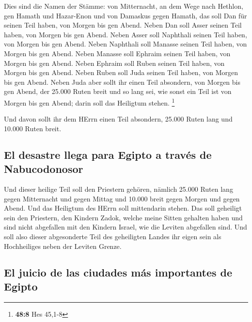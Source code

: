 Dies sind die Namen der Stämme: von Mitternacht, an dem
Wege nach Hethlon, gen Hamath und Hazar-Enon und von Damaskus gegen
Hamath, das soll Dan für seinen Teil haben, von Morgen bis gen Abend.
 Neben Dan soll Asser seinen Teil haben, von Morgen bis
gen Abend.  Neben Asser soll Naphthali seinen Teil haben,
von Morgen bis gen Abend.  Neben Naphthali soll Manasse
seinen Teil haben, von Morgen bis gen Abend.  Neben
Manasse soll Ephraim seinen Teil haben, von Morgen bis gen Abend.
 Neben Ephraim soll Ruben seinen Teil haben, von Morgen
bis gen Abend.  Neben Ruben soll Juda seinen Teil haben,
von Morgen bis gen Abend.  Neben Juda aber sollt ihr einen
Teil absondern, von Morgen bis gen Abend, der 25.000 Ruten breit und so
lang sei, wie sonst ein Teil ist von Morgen bis gen Abend; darin soll
das Heiligtum stehen. \footnote{\textbf{48:8} Hes 45,1-8}

 Und davon sollt ihr dem HErrn einen Teil absondern,
25.000 Ruten lang und 10.000 Ruten breit.

\hypertarget{el-desastre-llega-para-egipto-a-travuxe9s-de-nabucodonosor}{%
\subsection{El desastre llega para Egipto a través de
Nabucodonosor}\label{el-desastre-llega-para-egipto-a-travuxe9s-de-nabucodonosor}}

 Und dieser heilige Teil soll den Priestern gehören,
nämlich 25.000 Ruten lang gegen Mitternacht und gegen Mittag und 10.000
breit gegen Morgen und gegen Abend. Und das Heiligtum des HErrn soll
mittendarin stehen.  Das soll geheiligt sein den
Priestern, den Kindern Zadok, welche meine Sitten gehalten haben und
sind nicht abgefallen mit den Kindern Israel, wie die Leviten abgefallen
sind.  Und soll also dieser abgesonderte Teil des
geheiligten Landes ihr eigen sein als Hochheiliges neben der Leviten
Grenze.

\hypertarget{el-juicio-de-las-ciudades-muxe1s-importantes-de-egipto}{%
\subsection{El juicio de las ciudades más importantes de
Egipto}\label{el-juicio-de-las-ciudades-muxe1s-importantes-de-egipto}}

